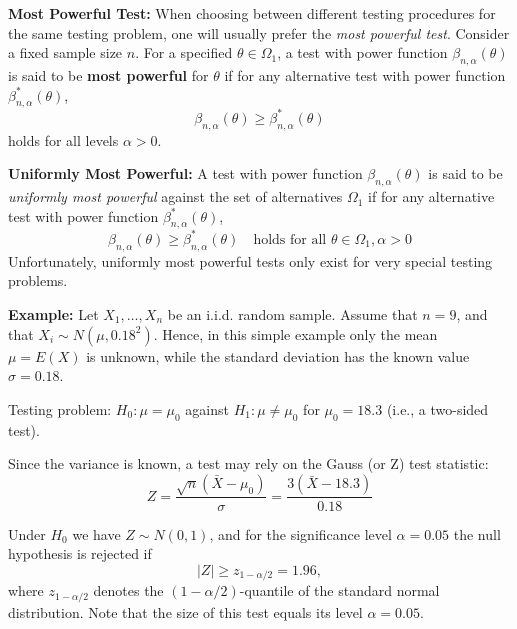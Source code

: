 \documentclass[
]{book}
\begin{document}
\textbf{Most Powerful Test:}
When choosing between different testing procedures for the same testing problem, one will usually prefer
the \emph{most powerful test}. Consider a fixed sample size \(n\). For a specified \(\theta\in\Omega_1\), a test with power function \(\beta_{n,\alpha}(\theta)\) is said to be \textbf{most powerful} for \(\theta\) if for any alternative test with power function \(\beta^*_{n,\alpha}(\theta)\),
\[\beta_{n,\alpha}(\theta)\ge \beta^*_{n,\alpha}(\theta)\]
holds for all levels \(\alpha>0\).

\textbf{Uniformly Most Powerful:}
A test with power function \(\beta_{n,\alpha}(\theta)\) is said to be \emph{uniformly most powerful} against the set of alternatives \(\Omega_1\) if for any alternative test with power function \(\beta^*_{n,\alpha}(\theta)\),
\[\beta_{n,\alpha}(\theta)\ge \beta^*_{n,\alpha}(\theta)\quad \text{holds for all }\theta\in\Omega_1, \alpha>0\]
Unfortunately, uniformly most powerful tests only exist for very special testing problems.

\hfill\break

\textbf{Example:}
Let \(X_1,\dots,X_n\) be an i.i.d. random sample.
Assume that \(n=9\), and that \(X_i\sim N(\mu,0.18^2)\).
Hence, in this simple example only the mean \(\mu=E(X)\) is unknown, while
the standard deviation has the known value \(\sigma=0.18\).

\hfill\break

Testing problem: \(H_0:\mu=\mu_0\) against \(H_1:\mu\neq \mu_0\) for \(\mu_0=18.3\) (i.e., a two-sided test).

\hfill\break

Since the variance is known, a test may rely on the Gauss (or Z) test statistic:
\[Z=\frac{\sqrt{n} (\bar X -\mu_0)}{\sigma} =\frac{3 (\bar X -18.3)}{0.18}\]

Under \(H_0\) we have \(Z\sim N(0,1)\), and for the significance level \(\alpha=0.05\) the null hypothesis is rejected if
\[|Z|\geq z_{1-\alpha/2}=1.96,\]
where \(z_{1-\alpha/2}\) denotes the \((1-\alpha/2)\)-quantile of the standard normal distribution. Note that the size of this test equals its level \(\alpha=0.05\).

\hfill\break
\end{document}

